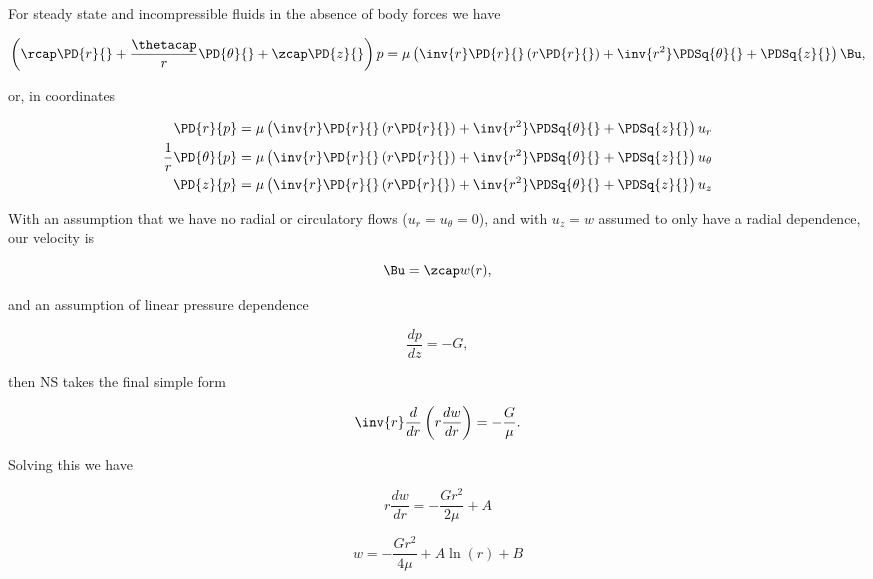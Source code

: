 For steady state and incompressible fluids in the absence of body forces we have

\begin{equation}\label{eqn:continuumL12:670}
\left(
\rcap \PD{r}{} + 
\frac{\thetacap}{r} \PD{\theta}{} + 
\zcap \PD{z}{}
\right)
p = \mu \left(
\inv{r} \PD{r}{} \left( r \PD{r}{} \right) + \inv{r^2} \PDSq{\theta}{} + \PDSq{z}{} \right)
\Bu,
\end{equation}

or, in coordinates

\begin{align}\label{eqn:continuumL12:690}
\PD{r}{p}  
&= \mu \left(
\inv{r} \PD{r}{} \left( r \PD{r}{} \right) + \inv{r^2} \PDSq{\theta}{} + \PDSq{z}{} \right)
u_r \\
\frac{1}{r} \PD{\theta}{p}
&= \mu \left(
\inv{r} \PD{r}{} \left( r \PD{r}{} \right) + \inv{r^2} \PDSq{\theta}{} + \PDSq{z}{} \right)
u_\theta \\
\PD{z}{p}
&= \mu \left(
\inv{r} \PD{r}{} \left( r \PD{r}{} \right) + \inv{r^2} \PDSq{\theta}{} + \PDSq{z}{} \right)
u_z
\end{align}

With an assumption that we have no radial or circulatory flows ($u_r = u_\theta = 0$), and with $u_z = w$ assumed to only have a radial dependence, our velocity is

\begin{equation}\label{eqn:continuumL12:50}
\Bu = \zcap w(r),
\end{equation}

and an assumption of linear pressure dependence

\begin{equation}\label{eqn:continuumL12:60}
\frac{dp}{dz} = -G,
\end{equation}

then NS takes the final simple form

\begin{equation}\label{eqn:continuumL12:70}
\inv{r} \frac{d}{dr} \left( r \frac{dw}{dr} \right) = - \frac{G}{\mu}.
\end{equation}

Solving this we have

\begin{equation}\label{eqn:continuumL12:90}
r \frac{dw}{dr} = - \frac{G r^2}{2\mu} + A
\end{equation}

\begin{equation}\label{eqn:continuumL12:110}
w = -\frac{G r^2}{4 \mu} + A \ln(r) + B
\end{equation}

